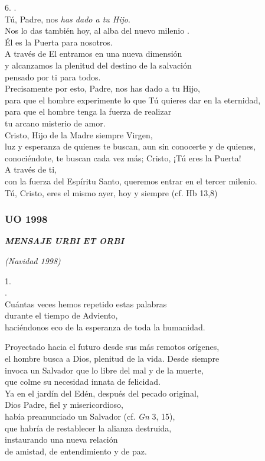 6. .\\ Tú, Padre, nos \emph{has dado a tu Hijo}.\\ Nos lo das también hoy, al alba del nuevo milenio .\\ Él es la Puerta para nosotros.\\ A través de El entramos en una nueva dimensión\\ y alcanzamos la plenitud del destino de la salvación\\ pensado por ti para todos.\\ Precisamente por esto, Padre, nos has dado a tu Hijo,\\ para que el hombre experimente lo que Tú quieres dar en la eternidad,\\ para que el hombre tenga la fuerza de realizar\\ tu arcano misterio de amor.\\ Cristo, Hijo de la Madre siempre Virgen,\\ luz y esperanza de quienes te buscan, aun sin conocerte y de quienes, conociéndote, te buscan cada vez más; Cristo, ¡Tú eres la Puerta!\\ A través de ti,\\ con la fuerza del Espíritu Santo, queremos entrar en el tercer milenio.\\ Tú, Cristo, eres el mismo ayer, hoy y siempre (cf. Hb 13,8)

\subsubsection{UO 1998} \textbf{\emph{MENSAJE URBI ET ORBI}}

\emph{(Navidad 1998)}

 

1. \emph{}\\ .\\ Cuántas veces hemos repetido estas palabras\\ durante el tiempo de Adviento,\\ haciéndonos eco de la esperanza de toda la humanidad.

Proyectado hacia el futuro desde sus más remotos orígenes,\\ el hombre busca a Dios, plenitud de la vida. Desde siempre\\ invoca un Salvador que lo libre del mal y de la muerte,\\ que colme su necesidad innata de felicidad.\\ Ya en el jardín del Edén, después del pecado original,\\ Dios Padre, fiel y misericordioso,\\ había preanunciado un Salvador (cf. \emph{Gn} 3, 15),\\ que habría de restablecer la alianza destruida,\\ instaurando una nueva relación\\ de amistad, de entendimiento y de paz.

